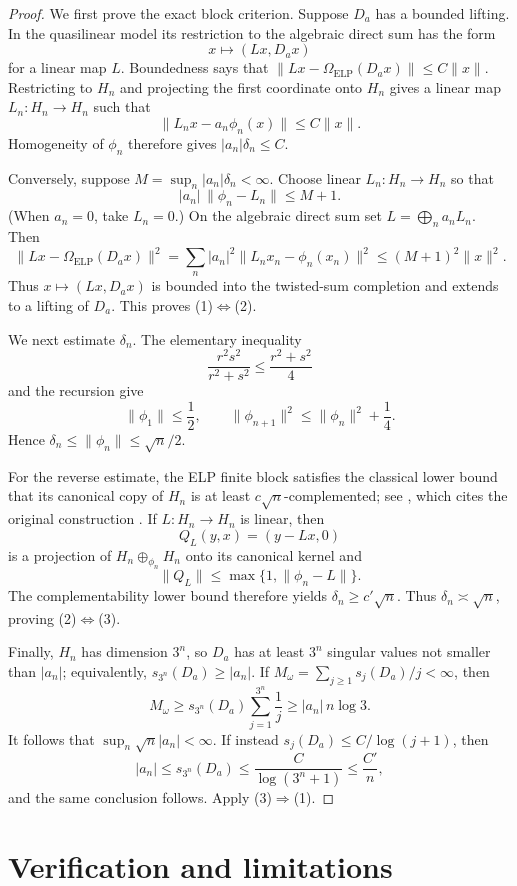 \documentclass[11pt]{article}
\newcommand{\ELP}{\operatorname{ELP}}
\begin{document}
\begin{proof}
We first prove the exact block criterion.  Suppose $D_a$ has a bounded
lifting.  In the quasilinear model its restriction to the algebraic direct
sum has the form
\[
 x\longmapsto (Lx,D_ax)
\]
for a linear map $L$.  Boundedness says that
$\|Lx-\Omega_{\ELP}(D_ax)\|\le C\|x\|$.  Restricting to $H_n$ and
projecting the first coordinate onto $H_n$ gives a linear map $L_n:H_n\to H_n$
such that
\[
 \|L_nx-a_n\phi_n(x)\|\le C\|x\|.
\]
Homogeneity of $\phi_n$ therefore gives $|a_n|\delta_n\le C$.

Conversely, suppose $M=\sup_n|a_n|\delta_n<\infty$.  Choose linear
$L_n:H_n\to H_n$ so that
\[
 |a_n|\,\|\phi_n-L_n\|\le M+1.
\]
(When $a_n=0$, take $L_n=0$.)  On the algebraic direct sum set
$L=\bigoplus_n a_nL_n$.  Then
\[
 \|Lx-\Omega_{\ELP}(D_ax)\|^2
 =\sum_n |a_n|^2\|L_nx_n-\phi_n(x_n)\|^2
 \le (M+1)^2\|x\|^2.
\]
Thus $x\mapsto(Lx,D_ax)$ is bounded into the twisted-sum completion and
extends to a lifting of $D_a$.  This proves (1)$\Leftrightarrow$(2).

We next estimate $\delta_n$.  The elementary inequality
\[
 \frac{r^2s^2}{r^2+s^2}\le\frac{r^2+s^2}{4}
\]
and the recursion give
\[
 \|\phi_1\|\le\frac12,
 \qquad
 \|\phi_{n+1}\|^2\le\|\phi_n\|^2+\frac14.
\]
Hence $\delta_n\le\|\phi_n\|\le\sqrt n/2$.

For the reverse estimate, the ELP finite block satisfies the classical lower
bound that its canonical copy of $H_n$ is at least $c\sqrt n$-complemented;
see \cite[Section 2.3]{CastilloCorrea2026}, which cites the original
construction \cite{ELP1975}.  If $L:H_n\to H_n$ is linear, then
\[
 Q_L(y,x)=(y-Lx,0)
\]
is a projection of $H_n\oplus_{\phi_n}H_n$ onto its canonical kernel and
\[
 \|Q_L\|\le \max\{1,\|\phi_n-L\|\}.
\]
The complementability lower bound therefore yields
$\delta_n\ge c'\sqrt n$.  Thus $\delta_n\asymp\sqrt n$, proving
(2)$\Leftrightarrow$(3).

Finally, $H_n$ has dimension $3^n$, so $D_a$ has at least $3^n$ singular
values not smaller than $|a_n|$; equivalently,
$s_{3^n}(D_a)\ge|a_n|$.  If
$M_\omega=\sum_{j\ge1}s_j(D_a)/j<\infty$, then
\[
 M_\omega\ge s_{3^n}(D_a)\sum_{j=1}^{3^n}\frac1j
 \ge |a_n|\,n\log3.
\]
It follows that $\sup_n\sqrt n|a_n|<\infty$.  If instead
$s_j(D_a)\le C/\log(j+1)$, then
\[
 |a_n|\le s_{3^n}(D_a)
 \le \frac{C}{\log(3^n+1)}\le\frac{C'}n,
\]
and the same conclusion follows.  Apply (3)$\Rightarrow$(1).
\end{proof}

\section{Verification and limitations}
\end{document}
